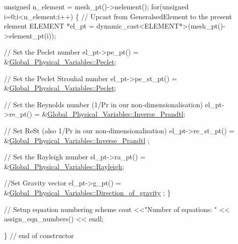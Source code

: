 \begin{DoxyCodeInclude}
 \textcolor{keywordtype}{unsigned} n\_element = mesh\_pt()->nelement();
 \textcolor{keywordflow}{for}(\textcolor{keywordtype}{unsigned} i=0;i<n\_element;i++)
  \{
   \textcolor{comment}{// Upcast from GeneralsedElement to the present element}
   ELEMENT *el\_pt = \textcolor{keyword}{dynamic\_cast<}ELEMENT*\textcolor{keyword}{>}(mesh\_pt()->element\_pt(i));

   \textcolor{comment}{// Set the Peclet number}
   el\_pt->pe\_pt() = &\hyperlink{namespaceGlobal__Physical__Variables_ad4cdf142ba50635d62ac4c614f445af7}{Global\_Physical\_Variables::Peclet};

   \textcolor{comment}{// Set the Peclet Strouhal number}
   el\_pt->pe\_st\_pt() = &\hyperlink{namespaceGlobal__Physical__Variables_ad4cdf142ba50635d62ac4c614f445af7}{Global\_Physical\_Variables::Peclet};

   \textcolor{comment}{// Set the Reynolds number (1/Pr in our non-dimensionalisation)}
   el\_pt->re\_pt() = &\hyperlink{namespaceGlobal__Physical__Variables_a87796c9f402e6f90c07cf5ba0db4367e}{Global\_Physical\_Variables::Inverse\_Prandtl};

   \textcolor{comment}{// Set ReSt (also 1/Pr in our non-dimensionalisation)}
   el\_pt->re\_st\_pt() = &\hyperlink{namespaceGlobal__Physical__Variables_a87796c9f402e6f90c07cf5ba0db4367e}{Global\_Physical\_Variables::Inverse\_Prandtl}
      ;

   \textcolor{comment}{// Set the Rayleigh number}
   el\_pt->ra\_pt() = &\hyperlink{namespaceGlobal__Physical__Variables_a637fd2a6a7c5b34ed3288300d8bf84b7}{Global\_Physical\_Variables::Rayleigh};

   \textcolor{comment}{//Set Gravity vector}
   el\_pt->g\_pt() = &\hyperlink{namespaceGlobal__Physical__Variables_a42f4a0aee37dbb36186267931c614053}{Global\_Physical\_Variables::Direction\_of\_gravity}
      ;
  \}

 \textcolor{comment}{// Setup equation numbering scheme}
 cout <<\textcolor{stringliteral}{"Number of equations: "} << assign\_eqn\_numbers() << endl; 

\} \textcolor{comment}{// end of constructor}

\end{DoxyCodeInclude}




 

